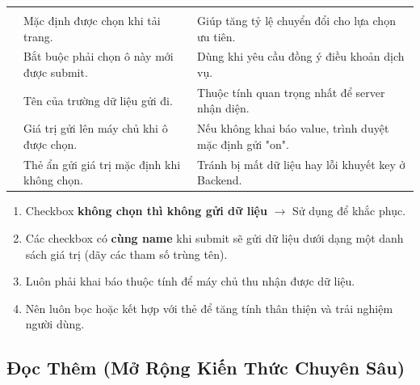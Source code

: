 \begin{prettyTableBox}
\begin{tabularx}{\linewidth}{K{2.8cm}Z Z}
 &  &  \\
 & Mặc định được chọn khi tải trang. & Giúp tăng tỷ lệ chuyển đổi cho lựa chọn ưu tiên. \\
 & Bắt buộc phải chọn ô này mới được submit. & Dùng khi yêu cầu đồng ý điều khoản dịch vụ. \\
 & Tên của trường dữ liệu gửi đi. & Thuộc tính quan trọng nhất để server nhận diện. \\
 & Giá trị gửi lên máy chủ khi ô được chọn. & Nếu không khai báo value, trình duyệt mặc định gửi "on". \\
 & Thẻ ẩn gửi giá trị mặc định khi không chọn. & Tránh bị mất dữ liệu hay lỗi khuyết key ở Backend. \\
\end{tabularx}
\end{prettyTableBox}

\begin{tipBox}
\begin{enumerate}[leftmargin=1.5em, itemsep=2pt, parsep=0pt]
    \item Checkbox \textbf{không chọn thì không gửi dữ liệu} $\rightarrow$ Sử dụng  để khắc phục.
    \item Các checkbox có \textbf{cùng name} khi submit sẽ gửi dữ liệu dưới dạng một danh sách giá trị (dãy các tham số trùng tên).
    \item Luôn phải khai báo thuộc tính  để máy chủ thu nhận được dữ liệu.
    \item Nên luôn bọc hoặc kết hợp với thẻ  để tăng tính thân thiện và trải nghiệm người dùng.
\end{enumerate}
\end{tipBox}

\subsection{Đọc Thêm (Mở Rộng Kiến Thức Chuyên Sâu)}
\label{subsec:checkbox_advanced_readmore}

